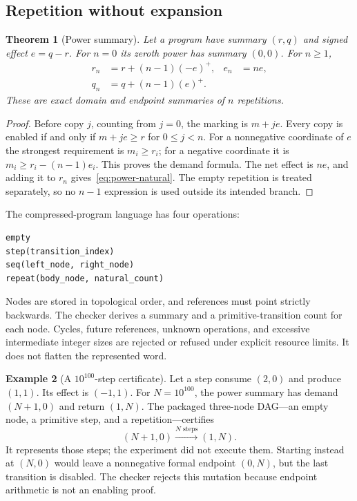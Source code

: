 \documentclass[11pt,a4paper]{article}
\newcommand{\pos}[1]{\left(#1\right)^{+}}
\newtheorem{theorem}{Theorem}[section]
\theoremstyle{definition}
\newtheorem{example}[theorem]{Example}
\theoremstyle{remark}
\begin{document}
\subsection{Repetition without expansion}
\begin{theorem}[Power summary]\label{thm:power}
Let a program have summary $(r,q)$ and signed effect $e=q-r$. For $n=0$ its zeroth power has summary $(0,0)$. For $n\ge1$,
\begin{align}
 r_n&=r+(n-1)\pos{-e}, & e_n&=ne,\label{eq:power-signed}\\
 q_n&=q+(n-1)\pos{e}.\label{eq:power-natural}
\end{align}
These are exact domain and endpoint summaries of $n$ repetitions.
\end{theorem}
\begin{proof}
Before copy $j$, counting from $j=0$, the marking is $m+je$. Every copy is enabled if and only if $m+je\ge r$ for $0\le j<n$. For a nonnegative coordinate of $e$ the strongest requirement is $m_i\ge r_i$; for a negative coordinate it is $m_i\ge r_i-(n-1)e_i$. This proves the demand formula. The net effect is $ne$, and adding it to $r_n$ gives~\eqref{eq:power-natural}. The empty repetition is treated separately, so no $n-1$ expression is used outside its intended branch.
\end{proof}

The compressed-program language has four operations:
\par\noindent\begin{minipage}{\linewidth}
\begin{lstlisting}
empty
step(transition_index)
seq(left_node, right_node)
repeat(body_node, natural_count)
\end{lstlisting}
\end{minipage}\par
Nodes are stored in topological order, and references must point strictly backwards. The checker derives a summary and a primitive-transition count for each node. Cycles, future references, unknown operations, and excessive intermediate integer sizes are rejected or refused under explicit resource limits. It does not flatten the represented word.

\begin{example}[A $10^{100}$-step certificate]\label{ex:huge}
Let a step consume $(2,0)$ and produce $(1,1)$. Its effect is $(-1,1)$. For $N=10^{100}$, the power summary has demand $(N+1,0)$ and return $(1,N)$. The packaged three-node DAG---an empty node, a primitive step, and a repetition---certifies
\[
 (N+1,0)\xrightarrow{\text{$N$ steps}}(1,N).
\]
It represents those steps; the experiment did not execute them. Starting instead at $(N,0)$ would leave a nonnegative formal endpoint $(0,N)$, but the last transition is disabled. The checker rejects this mutation because endpoint arithmetic is not an enabling proof.
\end{example}
\end{document}
